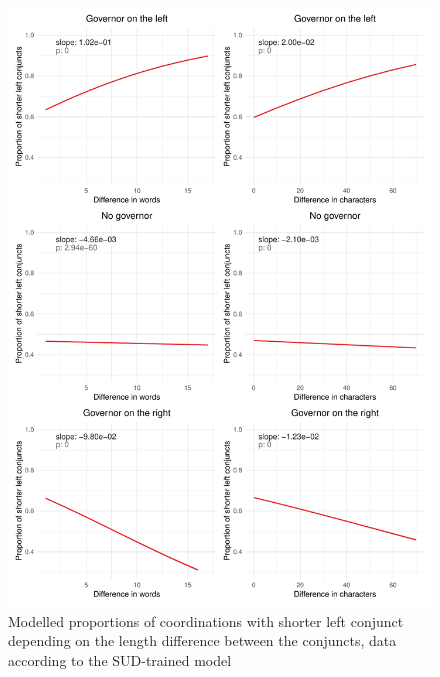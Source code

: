 \begin{figure}[hbt!]
    \includegraphics[width=\textwidth]{inputs/sud-modelled.pdf}
    \caption{\centering Modelled proportions of coordinations with shorter left conjunct depending on the length difference between the conjuncts, data according to the SUD-trained model}\label{fig:sud-logit}
\end{figure}

